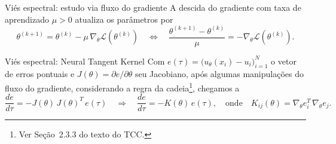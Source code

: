 \begin{frame}{Viés espectral: estudo via fluxo do gradiente}
  A descida do gradiente com taxa de aprendizado $\mu > 0$ atualiza os parâmetros por
  \begin{equation*}
    \theta^{(k+1)} = \theta^{(k)} - \mu\,\nabla_\theta\mathcal{L}(\theta^{(k)})
    \quad\Longleftrightarrow\quad
    \frac{\theta^{(k+1)} - \theta^{(k)}}{\mu} = -\nabla_\theta\mathcal{L}(\theta^{(k)}).
  \end{equation*}
\end{frame}

\begin{frame}{Viés espectral: Neural Tangent Kernel}
  Com $e(\tau) = \bigl(u_\theta(x_i) - u_i\bigr)_{i=1}^{N}$ o vetor de erros pontuais e
  $J(\theta) = \partial e/\partial\theta$ seu Jacobiano, após algumas manipulações do fluxo
  do gradiente, considerando a regra da cadeia\footnote{Ver Seção~2.3.3 do texto do TCC.},
  chegamos a
  \begin{equation*}
    \frac{de}{d\tau} = -J(\theta)\,J(\theta)^{T}\,e(\tau)
    \quad\Longrightarrow\quad
    \frac{de}{d\tau} = -K(\theta)\,e(\tau),
    \quad\text{onde}\quad
    K_{ij}(\theta) = \nabla_\theta e_i^{T}\,\nabla_\theta e_j .
  \end{equation*}
\end{frame}

